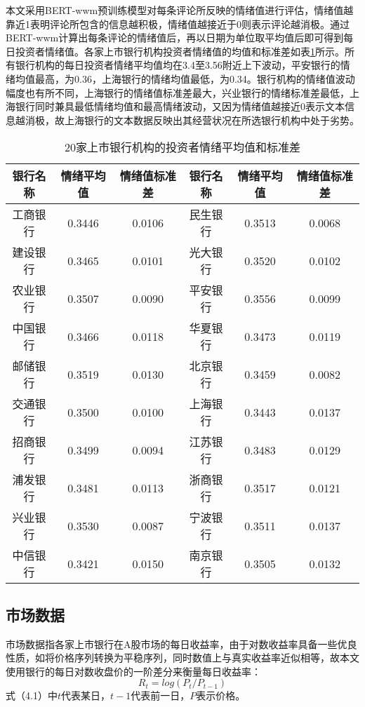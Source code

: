 \documentclass[lang=cn]{elegantpaper}
\begin{document}
本文采用BERT-wwm预训练模型对每条评论所反映的情绪值进行评估，情绪值越靠近1表明评论所包含的信息越积极，情绪值越接近于0则表示评论越消极。通过BERT-wwm计算出每条评论的情绪值后，再以日期为单位取平均值后即可得到每日投资者情绪值。各家上市银行机构投资者情绪值的均值和标准差如表\ref{表4}所示。所有银行机构的每日投资者情绪平均值均在3.4至3.56附近上下波动，平安银行的情绪均值最高，为0.36，上海银行的情绪均值最低，为0.34。银行机构的情绪值波动幅度也有所不同，上海银行的情绪值标准差最大，兴业银行的情绪标准差最低，上海银行同时兼具最低情绪均值和最高情绪波动，又因为情绪值越接近0表示文本信息越消极，故上海银行的文本数据反映出其经营状况在所选银行机构中处于劣势。
\setlength{\tabcolsep}{14.1pt}
\begin{longtable}{cccccc}
    \caption{20家上市银行机构的投资者情绪平均值和标准差}
    \label{表4}\\
    \toprule
    银行名称 & 情绪平均值    & 情绪值标准差   & 银行名称 & 情绪平均值    & 情绪值标准差   \\ \midrule
    \endhead
    \bottomrule
    \endfoot
    \endlastfoot
    工商银行 & 0.3446 & 0.0106 & 民生银行 & 0.3513 & 0.0068 \\
    建设银行 & 0.3465 & 0.0101 & 光大银行 & 0.3520 & 0.0102 \\
    农业银行 & 0.3507 & 0.0090 & 平安银行 & 0.3556 & 0.0099 \\
    中国银行 & 0.3466 & 0.0118 & 华夏银行 & 0.3473 & 0.0119 \\
    邮储银行 & 0.3519 & 0.0130 & 北京银行 & 0.3459 & 0.0082 \\
    交通银行 & 0.3500 & 0.0100 & 上海银行 & 0.3443 & 0.0137 \\
    招商银行 & 0.3499 & 0.0094 & 江苏银行 & 0.3483 & 0.0129 \\
    浦发银行 & 0.3481 & 0.0113 & 浙商银行 & 0.3517 & 0.0121 \\
    兴业银行 & 0.3530 & 0.0087 & 宁波银行 & 0.3511 & 0.0137 \\
    中信银行 & 0.3421 & 0.0150 & 南京银行 & 0.3505 & 0.0132 \\ \bottomrule
\end{longtable}
\subsection{市场数据}
市场数据指各家上市银行在A股市场的每日收益率，由于对数收益率具备一些优良性质，如将价格序列转换为平稳序列，同时数值上与真实收益率近似相等，故本文使用银行的每日对数收盘价的一阶差分来衡量每日收益率：
\begin{equation}
    R_t=log(P_t/P_{t-1})
\end{equation}
式（4.1）中$t$代表某日，$t-1$代表前一日，$P$表示价格。
\end{document}
